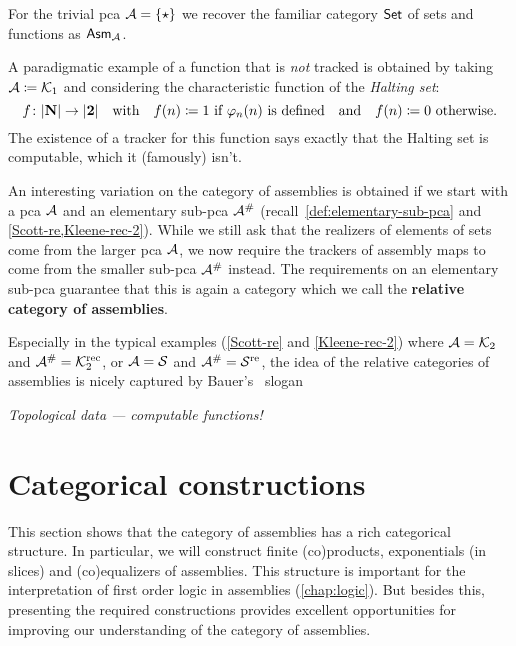 \begin{example}
  For the trivial pca \(\AA = \set{\singleton}\) we recover the familiar
  category \(\Set\) of sets and functions as \(\Asm{\AA}\).
\end{example}

\begin{example}
  A paradigmatic example of a function that is \emph{not} tracked is obtained by
  taking \(\AA \coloneqq \Kone\) and considering the characteristic function of
  the \emph{Halting set}:
  \[
    f \colon \carrier{\NatAsm} \to \carrier{\Two}
    \quad\text{with}\quad
    f(n) \coloneqq 1 \text{ if \(\prenum{n}(n)\) is defined}
    \quad\text{and}\quad
    f(n) \coloneqq 0 \text{ otherwise}.
  \]
  The existence of a tracker for this function says exactly that the Halting set
  is computable, which it (famously) isn't.
\end{example}

\begin{remark}
  An interesting variation on the category of assemblies is obtained if we start
  with a pca \(\AA\) and an elementary sub-pca \(\AA^\#\)
  (recall~\cref{def:elementary-sub-pca} and \cref{Scott-re,Kleene-rec-2}).
  While we still ask that the realizers of elements of sets come from the
  larger pca \(\AA\), we now require the trackers of assembly maps to come from
  the smaller sub-pca \(\AA^\#\) instead.
  The requirements on an elementary sub-pca guarantee that this is again a
  category which we call the \textbf{relative category of assemblies}.

  Especially in the typical examples (\ref{Scott-re} and \ref{Kleene-rec-2})
  where \(\AA = \Ktwo\) and \(\AA^\# = \Ktworec\), or \(\AA = \Scott\) and
  \(\AA^\# = \Scottre\), the idea of the relative categories of assemblies is
  nicely captured by Bauer's~\cite[p.~36 and 45]{Bauer2006,Bauer2023}
  slogan
  \begin{center}
    \emph{Topological data --- computable functions!}
  \end{center}
\end{remark}

\section{Categorical constructions}

This section shows that the category of assemblies has a rich categorical
structure. In particular, we will construct finite (co)products, exponentials
(in slices) and (co)equalizers of assemblies.
%
This structure is important for the interpretation of first order logic in
assemblies (\cref{chap:logic}).%
%
But besides this, presenting the required constructions provides excellent
opportunities for improving our understanding of the category of assemblies.

